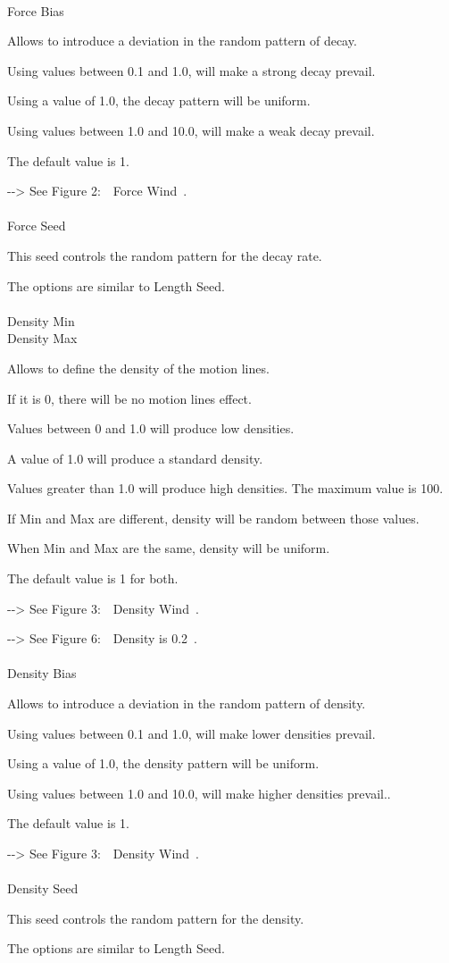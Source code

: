 \documentclass[a4paper,12pt]{article}
\begin{document}
\ \vspace{-0.2em}
\\
Force Bias\par
Allows to introduce a deviation in the random pattern of decay.\par
Using values between 0.1 and 1.0, will make a strong decay prevail.\par
Using a value of 1.0, the decay pattern will be uniform.\par
Using values between 1.0 and 10.0, will make a weak decay prevail.\par
The default value is 1.\par
-{-}> See \textquotedbl Figure 2:\ \ Force Wind\textquotedbl \ .\\
\\
Force Seed\par
This seed controls the random pattern for the decay rate.\par
The options are similar to \textquotedbl Length Seed\textquotedbl .\\
\\
Density Min\\
Density Max\par
Allows to define the density of the motion lines.\par
If it is 0, there will be no motion lines effect.\par
Values between 0 and 1.0 will produce low densities.\par
A value of 1.0 will produce a standard density.\par
Values greater than 1.0 will produce high densities. The maximum value is 100.\par
If Min and Max are different, density will be random between those values.\par 
When Min and Max are the same, density will be uniform.\par 
The default value is 1 for both.\par
-{-}> See \textquotedbl Figure 3:\ \ Density Wind\textquotedbl \ .\par
-{-}> See \textquotedbl Figure 6:\ \ Density is 0.2\textquotedbl \ .\\
\\
Density Bias\par
Allows to introduce a deviation in the random pattern of density.\par
Using values between 0.1 and 1.0, will make lower densities prevail.\par
Using a value of 1.0, the density pattern will be uniform.\par
Using values between 1.0 and 10.0, will make higher densities prevail..\par
The default value is 1.\par
-{-}> See \textquotedbl Figure 3:\ \ Density Wind\textquotedbl \ .\\
\\
Density Seed\par
This seed controls the random pattern for the density.\par
The options are similar to \textquotedbl Length Seed\textquotedbl .\\
\end{document}
